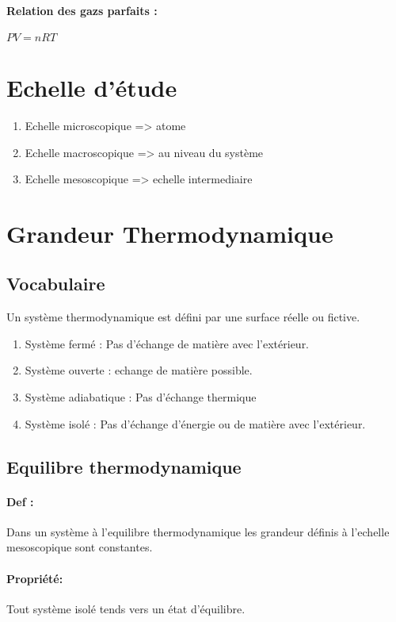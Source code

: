 \documentclass[a4paper,10pt]{report}
\begin{document}
 \paragraph{Relation des gazs parfaits :}
 \begin{math}
  PV=nRT
 \end{math}
\section{Echelle d'étude}
\begin{enumerate}
 \item Echelle microscopique => atome
 \item Echelle macroscopique => au niveau du système
 \item Echelle mesoscopique => echelle intermediaire
\end{enumerate}
\section{Grandeur Thermodynamique}
\subsection{Vocabulaire}
Un système thermodynamique est défini par une surface réelle ou fictive.
\begin{enumerate}
 \item Système fermé : Pas d'échange de matière avec l'extérieur.
 \item Système ouverte : echange de matière possible.
 \item Système adiabatique : Pas d'échange thermique
 \item Système isolé : Pas d'échange d'énergie ou de matière avec l'extérieur.
\end{enumerate}
\subsection{Equilibre thermodynamique}
\paragraph{Def :}
Dans un système à l'equilibre thermodynamique les grandeur définis à l'echelle mesoscopique sont constantes.
\paragraph{Propriété:}
Tout système isolé tends vers un état d'équilibre.
\end{document}

